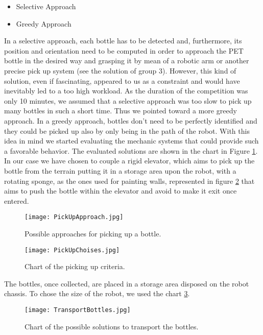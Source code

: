 \begin{itemize}
\item Selective Approach
\item Greedy Approach
\end{itemize}

In a selective approach, each bottle has to be detected and, furthermore, its position and orientation need to be computed in order to approach the PET bottle in the desired way and grasping it by mean of a robotic arm or another precise pick up system (see the solution of group 3). 
However, this kind of solution, even if fascinating, appeared to us as a constraint and would have inevitably led to a too high workload. 
As the duration of the competition was only 10 minutes, we assumed that a selective approach was too slow to pick up many bottles in such a short time. Thus we pointed toward a more greedy approach.
In a greedy approach, bottles don’t need to be perfectly identified and they could be picked up also by only being in the path of the robot.
With this idea in mind we started evaluating the mechanic systems that could provide such a favorable behavior.
The evaluated solutions are shown in the chart in Figure \ref{fig:PickUpApproach}.
In our case we have chosen to couple a rigid elevator, which aims to pick up the bottle from the terrain putting it in a storage area upon the robot, with a rotating sponge, as the ones used for painting walls, represented in figure \ref{fig:PickUpChoices} that aims to push the bottle within the elevator and avoid to make it exit once entered. 

\begin{figure}[H]
 \centering
 \texttt{[image: PickUpApproach.jpg]}
 \caption{Possible approaches for picking up a bottle.}
\label{fig:PickUpApproach}
\end{figure}

\begin{figure}[H]
 \centering
 \texttt{[image: PickUpChoises.jpg]}
 \caption{Chart of the picking up criteria.}
\label{fig:PickUpChoices}
\end{figure}

The bottles, once collected, are placed in a storage area disposed on the robot chassis. To chose the size of the robot, we used the chart \ref{fig:TransportBottles}.

\begin{figure}[H]
 \centering
 \texttt{[image: TransportBottles.jpg]}
 \caption{Chart of the possible solutions to transport the bottles.}
\label{fig:TransportBottles}
\end{figure}

